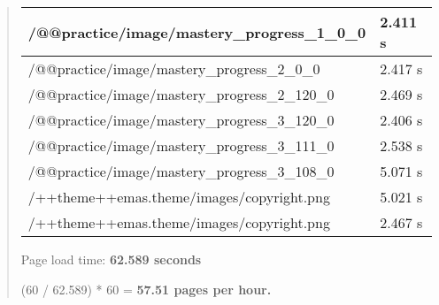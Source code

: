 \documentclass[letterpaper,10pt,english]{sphinxmanual}
\begin{document}
\begin{quote}
\begin{tabulary}{\linewidth}{|L|L|}
/@@practice/image/mastery\_progress\_1\_0\_0
 & 
2.411 s
\\\hline

/@@practice/image/mastery\_progress\_2\_0\_0
 & 
2.417 s
\\\hline

/@@practice/image/mastery\_progress\_2\_120\_0
 & 
2.469 s
\\\hline

/@@practice/image/mastery\_progress\_3\_120\_0
 & 
2.406 s
\\\hline

/@@practice/image/mastery\_progress\_3\_111\_0
 & 
2.538 s
\\\hline

/@@practice/image/mastery\_progress\_3\_108\_0
 & 
5.071 s
\\\hline

/++theme++emas.theme/images/copyright.png
 & 
5.021 s
\\\hline

/++theme++emas.theme/images/copyright.png
 & 
2.467 s
\\\hline
\end{tabulary}


Page load time: \textbf{62.589 seconds}

(60 / 62.589) * 60 = \textbf{57.51 pages per hour.}
\end{quote}
\end{document}
